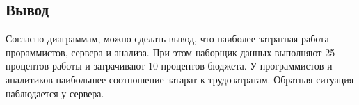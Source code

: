 \subsection*{Вывод}

Согласно диаграммам, можно сделать вывод, что наиболее затратная работа прораммистов, сервера и анализа.
При этом наборщик данных выполняют 25 процентов работы и затрачивают 10 процентов бюджета.
У программистов и аналитиков наибольшее соотношение затарат к трудозатратам.
Обратная ситуация наблюдается у сервера.